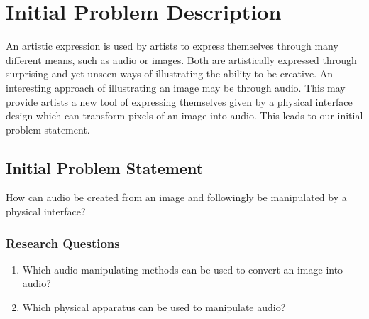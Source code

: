 \chapter{Initial Problem Description}\label{ch:initproblem}
An artistic expression is used by artists to express themselves through many different means, such as audio or images. Both are artistically expressed through surprising and yet unseen ways of illustrating the ability to be creative. An interesting approach of illustrating an image may be through audio. This may provide artists a new tool of expressing themselves given by a physical interface design which can transform pixels of an image into audio. This leads to our initial problem statement.

\section{Initial Problem Statement}\label{inistatement}

How can audio be created from an image and followingly be manipulated by a physical interface? 

\subsection{Research Questions}\label{resquestions}

\begin{enumerate}
\item Which audio manipulating methods can be used to convert an image into audio?
\item Which physical apparatus can be used to manipulate audio?

\end{enumerate}